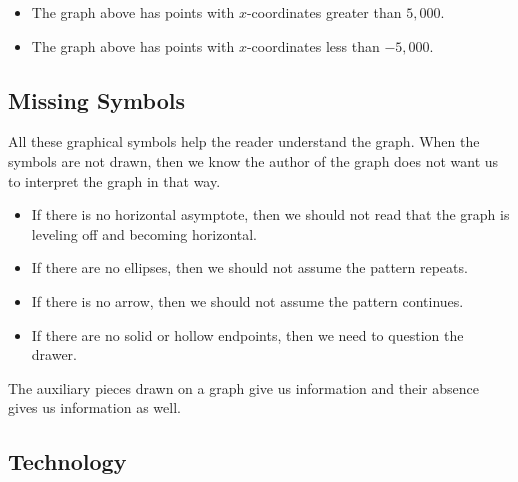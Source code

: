 \documentclass{ximera}
\begin{document}
\begin{question}
\begin{itemize}
\item The graph above has points with $x$-coordinates greater than $5,000$.
\begin{multipleChoice}
\end{multipleChoice}



\item The graph above has points with $x$-coordinates less than $-5,000$.
\begin{multipleChoice}
\end{multipleChoice}
\end{itemize}

\end{question}











\subsection*{Missing Symbols}

All these graphical symbols help the reader understand the graph.  When the symbols are not drawn, then we know the author of the graph does not want us to interpret the graph in that way.


\begin{itemize}
\item If there is no horizontal asymptote, then we should not read that the graph is leveling off and becoming horizontal.
\item If there are no ellipses, then we should not assume the pattern repeats.
\item If there is no arrow, then we should not assume the pattern continues.
\item If there are no solid or hollow endpoints, then we need to question the drawer.
\end{itemize}



The auxiliary pieces drawn on a graph give us information and their absence gives us information as well.









\subsection*{Technology}
\end{document}

